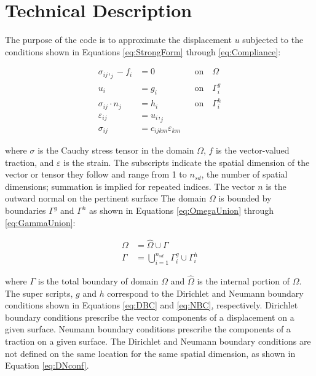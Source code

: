 \documentclass[a4paper, 12pt]{article}
\begin{document}
\section{Technical Description} \label{sec:techDes}
The purpose of the code is to approximate the displacement
$u$ subjected to the conditions shown in Equations
\ref{eq:StrongForm} through \ref{eq:Compliance}:

\begin{align}
\sigma_{ij},_{j} - f_i &= 0  &  &\text{on} \quad  \Omega
  \label{eq:StrongForm}                                          \\
u_i &= g_i                   &  &\text{on} \quad \Gamma^{g}_{i}
  \label{eq:DBC}                                                 \\
\sigma_{ij} \cdot n_j &= h_i &  &\text{on} \quad \Gamma^{h}_{i}
  \label{eq:NBC}                                                 \\
\varepsilon_{ij} &= u_{i},_{j}&  &\quad
  \label{eq:strainDef}                                           \\
\sigma_{ij} &= c_{ijkm} \varepsilon_{km} & &\quad
  \label{eq:Compliance}
\end{align}

\noindent
where $\sigma$ is the Cauchy stress tensor in
the domain $\Omega$, $f$ is the
vector-valued traction, and $\varepsilon$ is the strain.
The subscripts indicate the spatial dimension of the vector or
tensor they follow and range from 1 to $n_{sd}$, the number
of spatial dimensions; summation is implied for repeated
indices. The vector $n$ is the outward normal on the pertinent surface
The domain $\Omega$ is bounded by boundaries
$\Gamma^{g}$ and $\Gamma^{h}$ as shown
in Equations \ref{eq:OmegaUnion} through \ref{eq:GammaUnion}:

\begin{align}
\Omega &= \hat{\Omega} \cup \Gamma
  \label{eq:OmegaUnion}               \\
\Gamma &= \bigcup_{i=1}^{n_{sd}} \Gamma^{g}_{i} \cup \Gamma^{h}_{i}
  \label{eq:GammaUnion}
\end{align}

\noindent
where $\Gamma$ is the total boundary of domain $\Omega$
and $\hat{\Omega}$ is the internal portion of $\Omega$.
The super scripts, $g$ and $h$ correspond
to the Dirichlet and Neumann boundary conditions shown in Equations
\ref{eq:DBC} and \ref{eq:NBC}, respectively. Dirichlet boundary
conditions prescribe the vector components of a
displacement on a given surface.
Neumann boundary conditions prescribe the components of a
traction on a given surface.  The Dirichlet and
Neumann boundary conditions are not defined on the same location
for the same spatial dimension, as shown in Equation \ref{eq:DNconf}.
\end{document}
